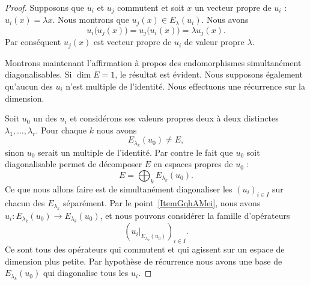 \begin{proof}
    Supposons que \( u_i\) et \( u_j\) commutent et soit \( x\) un vecteur propre de \( u_i\) : \( u_i(x)=\lambda x\). Nous montrons que \( u_j(x)\in E_{\lambda}(u_i)\). Nous avons
    \begin{equation}
        u_i\big( u_j(x) \big)=u_j\big( u_i(x) \big)=\lambda u_j(x).
    \end{equation}
    Par conséquent \( u_j(x)\) est vecteur propre de \( u_i\) de valeur propre \( \lambda\).

    Montrons maintenant l'affirmation à propos des endomorphismes simultanément diagonalisables. Si \( \dim E=1\), le résultat est évident. Nous supposons également qu'aucun des \( u_i\) n'est multiple de l'identité. Nous effectuons une récurrence sur la dimension.

    Soit \( u_0\) un des \( u_i\) et considérons ses valeurs propres deux à deux distinctes \( \lambda_1,\ldots, \lambda_r\). Pour chaque \( k\) nous avons
    \begin{equation}
        E_{\lambda_k}(u_0)\neq E,
    \end{equation}
    sinon \( u_0\) serait un multiple de l'identité. Par contre le fait que \( u_0\) soit diagonalisable permet de décomposer \( E\) en espaces propres de \( u_0\) :
    \begin{equation}
        E=\bigoplus_{k}E_{\lambda_k}(u_0).
    \end{equation}
    Ce que nous allons faire est de simultanément diagonaliser les \( (u_i)_{i\in I}\) sur chacun des \( E_{\lambda_k}\) séparément. Par le point~\ref{ItemGqhAMei}, nous avons \( u_i\colon E_{\lambda_k}(u_0)\to E_{\lambda_k}(u_0)\), et nous pouvons considérer la famille d'opérateurs
    \begin{equation}
        \left( u_i|_{E_{\lambda_k}(u_0)} \right)_{i\in I}.
    \end{equation}
    Ce sont tous des opérateurs qui commutent et qui agissent sur un espace de dimension plus petite. Par hypothèse de récurrence nous avons une base de \( E_{\lambda_k}(u_0)\) qui diagonalise tous les \( u_i\).
\end{proof}

